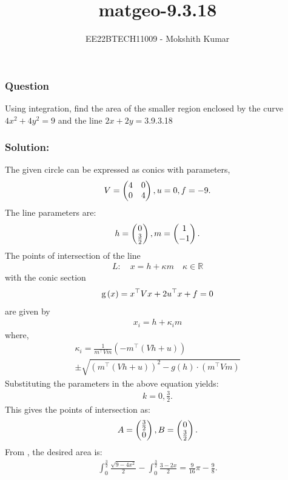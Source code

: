 \documentclass{beamer}
\newcommand{\mySolution}{\noindent \textbf{Solution: }}
\begin{document}
\title{matgeo-9.3.18}
\author{EE22BTECH11009 - Mokshith Kumar$^{}$
}
\frame{\titlepage}
\begin{frame}
\frametitle{Question}
Using integration, find the area of the smaller region enclosed by the curve $4x^2 + 4y^2 = 9$ and the line $2x + 2y = 3$.\hfill{9.3.18}
\end{frame}
\begin{frame}
\frametitle{\mySolution}
The given circle can be expressed as conics with parameters,
\begin{align}
    V=\begin{pmatrix}4 & 0\\0 & 4\end{pmatrix}, u=0, f=-9.
\end{align}
The line parameters are:
\begin{align}
    h=\begin{pmatrix}0\\ \frac{3}{2}\end{pmatrix}, m=\begin{pmatrix}1\\-1\end{pmatrix}.
\end{align}
The points of intersection of the line 
\begin{align}
L: \quad x = h + \kappa m \quad \kappa \in \mathbb{R}
\end{align}
with the conic section 
\begin{align}
    \text{g}\left(x\right) = x^{\top}Vx + 2u^{\top}x + f = 0
\end{align}
are given by
\begin{align}
x_i = h + \kappa_i m
\end{align}
where,
\begin{multline}
\kappa_i = \frac{1}{m^{\top}Vm} \left( -m^{\top}(Vh+u) \right) \\
\pm \sqrt{
\left( m^{\top}(Vh+u) \right)^2 - g(h) \cdot (m^{\top}Vm)
}
\end{multline}
Substituting the parameters in the above equation yields:
\begin{align}
    k=0,\frac{3}{2}.
\end{align}
This gives the points of intersection as:
\begin{align}
    A=\begin{pmatrix}\frac{3}{2}\\0\end{pmatrix}, B=\begin{pmatrix}0\\ \frac{3}{2}\end{pmatrix}.
\end{align}
From , the desired area is:
\begin{align}
\int_{0}^{\frac{3}{2}}\frac{\sqrt{9-4x^2}}{2}-\int_{0}^{\frac{3}{2}}\frac{3-2x}{2}=\frac{9}{16}\pi-\frac{9}{8}.
\end{align}
\end{frame}
\end{document}
